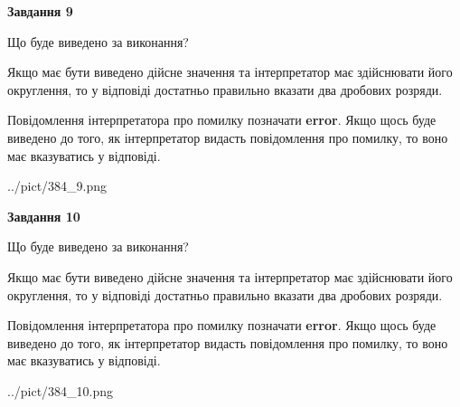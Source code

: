 \documentclass[12pt, ukrainian]{article}
\begin{document}
{\begin {Large}
{\begin {center}\textbf{Завдання 9}\end {center}}\par
Що буде виведено за виконання? \par

Якщо має бути виведено дійсне значення та інтерпретатор має здійснювати його округлення, 
то у відповіді достатньо правильно вказати два дробових розряди.

Повідомлення інтерпретатора про помилку позначати \textbf{error}.
Якщо щось буде виведено до того, як інтерпретатор видасть повідомлення про помилку, 
то воно має вказуватись у відповіді. \par

\begin{center}
	{../pict/384_9.png}
\end{center}
\newpage

{\begin {center}\textbf{Завдання 10}\end {center}}\par
Що буде виведено за виконання? \par

Якщо має бути виведено дійсне значення та інтерпретатор має здійснювати його округлення, 
то у відповіді достатньо правильно вказати два дробових розряди.

Повідомлення інтерпретатора про помилку позначати \textbf{error}.
Якщо щось буде виведено до того, як інтерпретатор видасть повідомлення про помилку, 
то воно має вказуватись у відповіді. \par

\begin{center}
	{../pict/384_10.png}
\end{center}
\newpage

\end {Large}}
\end{document}
